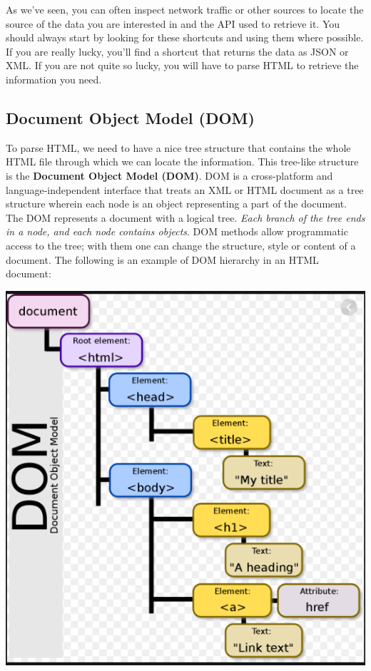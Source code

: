 \documentclass[]{book}
\begin{document}
As we've seen, you can often inspect network traffic or other sources to locate the source of the data you are interested in and the API used to retrieve it. You should always start by looking for these shortcuts and using them where possible. If you are really lucky, you'll find a shortcut that returns the data as JSON or XML. If you are not quite so lucky, you will have to parse HTML to retrieve the information you need.

\hypertarget{document-object-model-dom}{%
\subsection{Document Object Model (DOM)}\label{document-object-model-dom}}

To parse HTML, we need to have a nice tree structure that contains the whole HTML file through which we can locate the information. This tree-like structure is the \textbf{Document Object Model (DOM)}. DOM is a cross-platform and language-independent interface that treats an XML or HTML document as a tree structure wherein each node is an object representing a part of the document. The DOM represents a document with a logical tree. \emph{Each branch of the tree ends in a node, and each node contains objects}. DOM methods allow programmatic access to the tree; with them one can change the structure, style or content of a document. The following is an example of DOM hierarchy in an HTML document:

\includegraphics{Python/PythonWebScrape/images/DOM.png}
\end{document}
